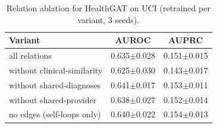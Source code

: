 \begin{table}[t]\centering\caption{Relation ablation for HealthGAT on UCI (retrained per variant, 3 seeds).}\label{tab:abl}\footnotesize
\begin{tabular}{lcc}\toprule Variant & AUROC & AUPRC \\\midrule
all relations & 0.635$\pm$0.028 & 0.151$\pm$0.015 \\
without clinical-similarity & 0.625$\pm$0.030 & 0.143$\pm$0.017 \\
without shared-diagnoses & 0.641$\pm$0.017 & 0.153$\pm$0.011 \\
without shared-provider & 0.638$\pm$0.027 & 0.152$\pm$0.014 \\
no edges (self-loops only) & 0.640$\pm$0.022 & 0.154$\pm$0.013 \\
\bottomrule\end{tabular}\end{table}
